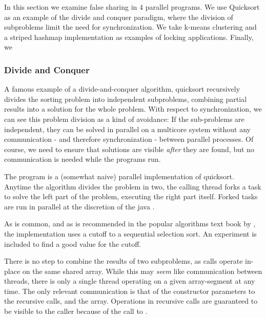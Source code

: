In this section we examine false sharing in 4  parallel programs. We use Quicksort as an example of the divide and
conquer paradigm, where the division of subproblems limit the need for
synchronization. We take k-means clustering and a striped hashmap implementation
as examples of locking applications. Finally, we 

\subsubsection{Divide and Conquer }
A famous example of a divide-and-conquer algorithm, quicksort recursively
divides the sorting problem into independent subproblems, combining partial
results into a solution for the whole problem. With respect to synchronization,
we can see this problem division as a kind of avoidance: If the sub-problems are
independent, they can be solved in parallel on a multicore system without any
communication - and therefore synchronization - between parallel processes.
Of course, we need to ensure that solutions are visible \textit{after} they are
found, but no communication is needed while the programs run.


The program is a (somewhat naive) parallel implementation of quicksort. Anytime
the algorithm divides the problem in two, the calling thread forks a task to
solve the left part of the problem, executing the right part itself. Forked
tasks are run in parallel at the discretion of the java .

As is common, and as is recommended in the popular algorithms text book by
\citet{sedgewick}, the implementation uses a cutoff to a sequential selection
sort. An experiment is included to find a good value for the cutoff.

There is no step to combine the results of two subproblems, as calls operate
in-place on the same shared array. While this may \textit{seem} like communication
between threads, there is only a single thread operating on a given
array-segment at any time. The only relevant communication is that of the
constructor parameters to the recursive calls, and the array. Operations in
recursive calls are guaranteed to be visible to the caller because of the
call to .


